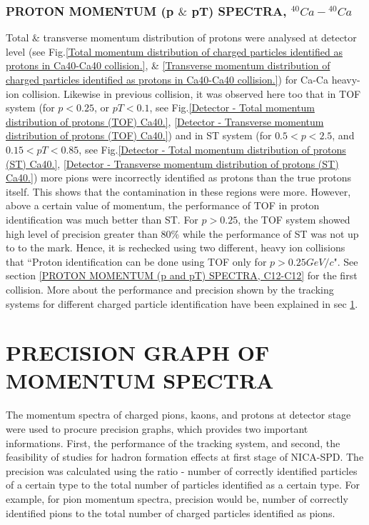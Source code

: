 \documentclass[12pt, twocolumn]{article}
\begin{document}
\subsubsection{PROTON MOMENTUM (p $\&$ pT) SPECTRA, $^{40}Ca-{^{40}Ca}$}
\label{PROTON MOMENTUM (p and pT) SPECTRA, Ca40-Ca40}  
Total $\&$ transverse momentum distribution of protons were analysed at detector level (see Fig.\ref{Total momentum distribution of charged particles identified as protons in Ca40-Ca40 collision.}, \& \ref{Transverse momentum distribution of charged particles identified as protons in Ca40-Ca40 collision.}) for Ca-Ca heavy-ion collision. Likewise in previous collision, it was observed here too that in TOF system (for $p < 0.25$, or $pT < 0.1$, see Fig.\ref{Detector - Total momentum distribution of protons (TOF) Ca40.}, \ref{Detector - Transverse momentum distribution of protons (TOF) Ca40.}) and in ST system (for $0.5 < p < 2.5$, and $0.15 < pT < 0.85$, see Fig.\ref{Detector - Total momentum distribution of protons (ST) Ca40.}, \ref{Detector - Transverse momentum distribution of protons (ST) Ca40.}) more pions were incorrectly identified as protons than the true protons itself. This shows that the contamination in these regions were more. However, above a certain value of momentum, the performance of TOF in proton identification was much better than ST. For $p > 0.25$, the TOF system showed high level of precision greater than 80\% while the performance of ST was not up to to the mark. Hence, it is rechecked using two different, heavy ion collisions that ``Proton identification can be done using TOF only for $p > 0.25 GeV/c$". See section \ref{PROTON MOMENTUM (p and pT) SPECTRA, C12-C12} for the first collision. More about the performance and precision shown by the tracking systems for different charged particle identification have been explained in sec \ref{PRECISION GRAPH OF MOMENTUM SPECTRA}.  

\section{PRECISION GRAPH OF MOMENTUM SPECTRA}
\label{PRECISION GRAPH OF MOMENTUM SPECTRA}
The momentum spectra of charged pions, kaons, and protons at detector stage were used to procure precision graphs, which provides two important informations. First, the performance of the tracking system, and second, the feasibility of studies for hadron formation effects at first stage of NICA-SPD. The precision was calculated using the ratio - number of correctly identified particles of a certain type to the total number of particles identified as a certain type. For example, for pion momentum spectra, precision would be, number of correctly identified pions to the total number of charged particles identified as pions.
\end{document}

